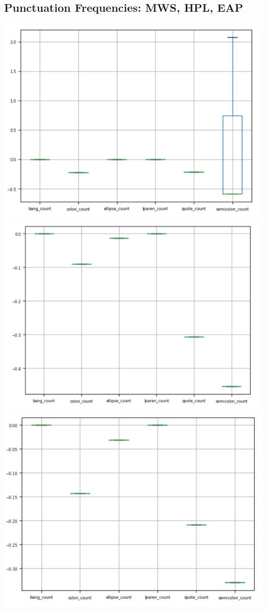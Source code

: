 \documentclass[12pt]{article}
\begin{document}
\subsection{Punctuation Frequencies: MWS, HPL, EAP}
\includegraphics[scale=.50, center]{images/punc_mws.png}
\vskip 0.2in
\includegraphics[scale=.50, center]{images/punc_hpl.png}
\vskip 0.2in
\includegraphics[scale=.50, center]{images/punc_eap.png}
\end{document}
